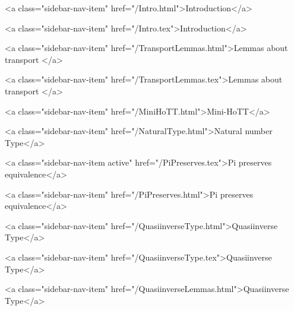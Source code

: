       
    
      
        
          <a class="sidebar-nav-item" href="/Intro.html">Introduction</a>
        
      
    
      
        
          <a class="sidebar-nav-item" href="/Intro.tex">Introduction</a>
        
      
    
      
        
          <a class="sidebar-nav-item" href="/TransportLemmas.html">Lemmas about transport </a>
        
      
    
      
        
          <a class="sidebar-nav-item" href="/TransportLemmas.tex">Lemmas about transport </a>
        
      
    
      
        
          <a class="sidebar-nav-item" href="/MiniHoTT.html">Mini-HoTT</a>
        
      
    
      
        
          <a class="sidebar-nav-item" href="/NaturalType.html">Natural number Type</a>
        
      
    
      
        
          <a class="sidebar-nav-item active" href="/PiPreserves.tex">Pi preserves equivalence</a>
        
      
    
      
        
          <a class="sidebar-nav-item" href="/PiPreserves.html">Pi preserves equivalence</a>
        
      
    
      
        
          <a class="sidebar-nav-item" href="/QuasiinverseType.html">Quasiinverse Type</a>
        
      
    
      
        
          <a class="sidebar-nav-item" href="/QuasiinverseType.tex">Quasiinverse Type</a>
        
      
    
      
        
          <a class="sidebar-nav-item" href="/QuasiinverseLemmas.html">Quasiinverse Type</a>
        
